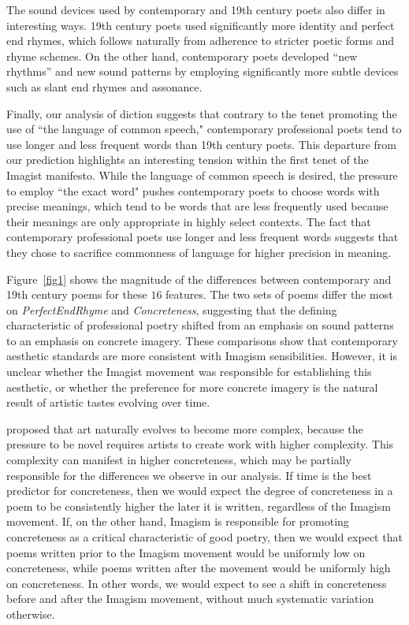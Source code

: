 \documentclass{book}
\begin{document}
The sound devices used by contemporary and 19th century poets also differ in interesting ways. 19th century poets used significantly more identity and perfect end rhymes, which follows naturally from adherence to stricter poetic forms and rhyme schemes. On the other hand, contemporary poets developed ``new rhythms'' and new sound patterns by employing significantly more subtle devices such as slant end rhymes and assonance.

Finally, our analysis of diction suggests that contrary to the tenet promoting the use of ``the language of common speech," contemporary professional poets tend to use longer and less frequent words than 19th century poets. This departure from our prediction highlights an interesting tension within the first tenet of the Imagist manifesto. While the language of common speech is desired, the pressure to employ ``the exact word" pushes contemporary poets to choose words with precise meanings, which tend to be words that are less frequently used because their meanings are only appropriate in highly select contexts. The fact that contemporary professional poets use longer and less frequent words suggests that they chose to sacrifice commonness of language for higher precision in meaning.

Figure~\ref{fig1} shows the magnitude of the differences  between contemporary and 19th century poems for these $16$ features. The two sets of poems differ the most on \emph{PerfectEndRhyme} and \emph{Concreteness}, suggesting that the defining characteristic of professional poetry shifted from an emphasis on sound patterns to an emphasis on concrete imagery. These comparisons show that contemporary aesthetic standards are more consistent with Imagism sensibilities. However, it is unclear whether the Imagist movement was responsible for establishing this aesthetic, or whether the preference for more concrete imagery is the natural result of artistic tastes evolving over time. 

\cite{martindale1990clockwork} proposed that art naturally evolves to become more complex, because the pressure to be novel requires artists to create work with higher complexity. %
This complexity can manifest in higher concreteness, which may be partially responsible for the differences we observe in our analysis. If time is the best predictor for concreteness, then we would expect the degree of concreteness in a poem to be consistently higher the later it is written, regardless of the Imagism movement. If, on the other hand, Imagism is responsible for promoting concreteness as a critical characteristic of good poetry, then we would expect that poems written prior to the Imagism movement would be uniformly low on concreteness, while poems written after the movement would be uniformly high on concreteness. In other words, we would expect to see a shift in concreteness before and after the Imagism movement, without much systematic variation otherwise.
\end{document}
